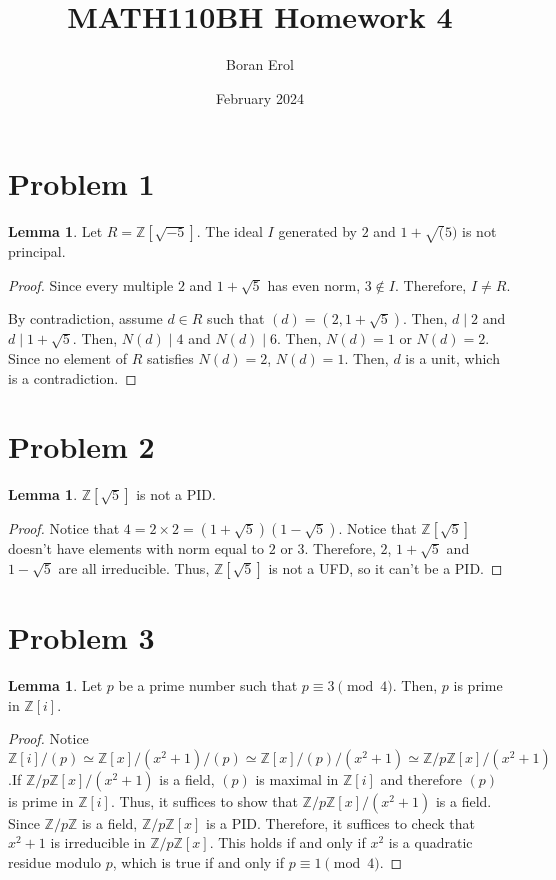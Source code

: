 \documentclass{article}
\title{MATH110BH Homework 4}
\date{February 2024}
\author{Boran Erol}
\theoremstyle{definition}
\newtheorem{lemma}[theorem]{Lemma}
\begin{document}
\maketitle

\section{Problem 1}

\begin{lemma}
    Let $R = \mathbb{Z}[\sqrt{-5}]$. The ideal $I$ generated by $2$ and $1 + \sqrt(5)$ is not principal.
\end{lemma}
\begin{proof}
    Since every multiple $2$ and $1 + \sqrt{5}$ has even norm, $3 \notin I$. Therefore, $I \neq R$.

    By contradiction, assume $d \in R$ such that $(d) = (2, 1 + \sqrt{5})$. Then, $d \mid 2$ and $d \mid 1 + \sqrt{5}$. Then, $N(d) \mid 4$ and $N(d) \mid 6$. Then, $N(d) = 1$ or $N(d) = 2$. Since no element of $R$ satisfies $N(d) = 2$, $N(d) = 1$. Then, $d$ is a unit, which is a contradiction.
\end{proof}

\section{Problem 2}

\begin{lemma}
    $\mathbb{Z}[\sqrt{5}]$ is not a PID.
\end{lemma}
\begin{proof}
    Notice that $4 = 2 \times 2 = (1 + \sqrt{5})(1 - \sqrt{5})$. Notice that $\mathbb{Z}[\sqrt{5}]$ doesn't have elements with norm equal to $2$ or $3$. Therefore, $2$, $1 + \sqrt{5}$ and $1 - \sqrt{5}$ are all irreducible. Thus, $\mathbb{Z}[\sqrt{5}]$ is not a UFD, so it can't be a PID.
\end{proof}

\section{Problem 3}

\begin{lemma}
    Let $p$ be a prime number such that $p \equiv 3 \pmod{4}$. Then, $p$ is prime in $\mathbb{Z}[i]$.
\end{lemma}

\begin{proof}
    Notice $\mathbb{Z}[i]/(p) \simeq \mathbb{Z}[x]/(x^{2} + 1)/(p) \simeq \mathbb{Z}[x]/(p)/(x^{2} + 1) \simeq \mathbb{Z}/p\mathbb{Z}[x]/(x^{2}+1)$.If $\mathbb{Z}/p\mathbb{Z}[x]/(x^{2}+1)$ is a field, $(p)$ is maximal in $\mathbb{Z}[i]$ and therefore $(p)$ is prime in $\mathbb{Z}[i]$. Thus, it suffices to show that $\mathbb{Z}/p\mathbb{Z}[x]/(x^{2}+1)$ is a field. Since $\mathbb{Z}/p\mathbb{Z}$ is a field, $\mathbb{Z}/p\mathbb{Z}[x]$ is a PID. Therefore, it suffices to check that $x^{2} + 1$ is irreducible in $\mathbb{Z}/p\mathbb{Z}[x]$. This holds if and only if $x^{2}$ is a quadratic residue modulo $p$, which is true if and only if $p \equiv 1 \pmod 4$.
\end{proof}
\end{document}
